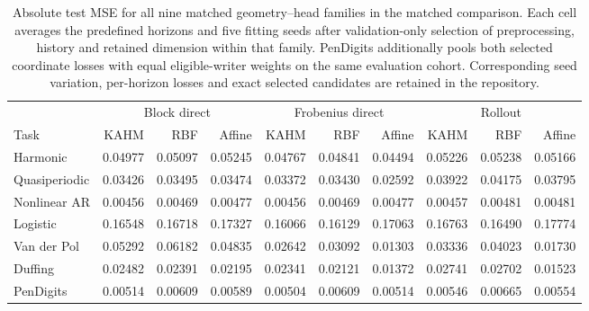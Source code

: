 \begin{table}[t]
\centering
\footnotesize
\setlength{\tabcolsep}{3pt}
\begin{tabular}{lrrrrrrrrr}
\toprule
& \multicolumn{3}{c}{Block direct} & \multicolumn{3}{c}{Frobenius direct} & \multicolumn{3}{c}{Rollout} \\
\cmidrule(lr){2-4}\cmidrule(lr){5-7}\cmidrule(lr){8-10}
Task & KAHM & RBF & Affine & KAHM & RBF & Affine & KAHM & RBF & Affine \\
\midrule
Harmonic & 0.04977 & 0.05097 & 0.05245 & 0.04767 & 0.04841 & 0.04494 & 0.05226 & 0.05238 & 0.05166 \\
Quasiperiodic & 0.03426 & 0.03495 & 0.03474 & 0.03372 & 0.03430 & 0.02592 & 0.03922 & 0.04175 & 0.03795 \\
Nonlinear AR & 0.00456 & 0.00469 & 0.00477 & 0.00456 & 0.00469 & 0.00477 & 0.00457 & 0.00481 & 0.00481 \\
Logistic & 0.16548 & 0.16718 & 0.17327 & 0.16066 & 0.16129 & 0.17063 & 0.16763 & 0.16490 & 0.17774 \\
Van der Pol & 0.05292 & 0.06182 & 0.04835 & 0.02642 & 0.03092 & 0.01303 & 0.03336 & 0.04023 & 0.01730 \\
Duffing & 0.02482 & 0.02391 & 0.02195 & 0.02341 & 0.02121 & 0.01372 & 0.02741 & 0.02702 & 0.01523 \\
PenDigits & 0.00514 & 0.00609 & 0.00589 & 0.00504 & 0.00609 & 0.00514 & 0.00546 & 0.00665 & 0.00554 \\
\bottomrule
\end{tabular}
\caption{Absolute test MSE for all nine matched geometry--head families in the matched comparison. Each cell averages the predefined horizons and five fitting seeds after validation-only selection of preprocessing, history and retained dimension within that family. PenDigits additionally pools both selected coordinate losses with equal eligible-writer weights on the same evaluation cohort. Corresponding seed variation, per-horizon losses and exact selected candidates are retained in the repository.}
\label{tab:matched-geometry-mse}
\end{table}
